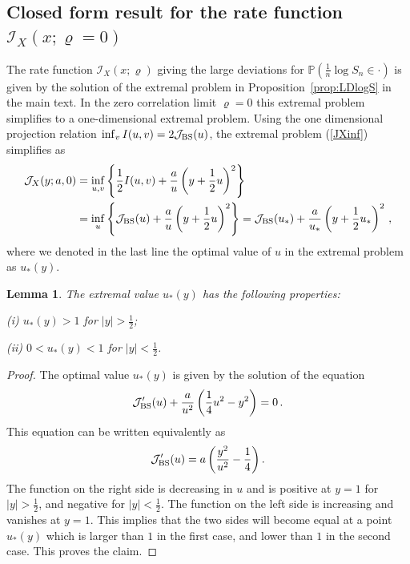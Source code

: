 \documentclass[11pt]{article}
\numberwithin{equation}{section}
\theoremstyle{plain}
\newtheorem{lemma}[theorem]{Lemma}
\begin{document}
\subsection{Closed form result for the rate function $\mathcal{I}_X(x;\varrho=0)$}
\label{sec:a1}

The rate function  $\mathcal{I}_X(x;\varrho)$ giving the large deviations for 
$\mathbb{P}(\frac{1}{n}
\log S_n\in \cdot)$ is given by the solution of the extremal problem
in Proposition~\ref{prop:LDlogS} in the main text. %
In the zero correlation limit $\varrho=0$ this extremal problem simplifies 
to a one-dimensional extremal problem. Using the one dimensional projection 
relation $\inf_v I(u,v) = 2\mathcal{J}_{\rm BS}(u)$, the extremal problem 
(\ref{JXinf}) simplifies as
\begin{align}\label{1dimJX}
\mathcal{J}_X(y; a,0) &=\inf_{u,v} \left\{ \frac12 I(u,v) + \frac{a}{u}
\left( y + \frac12 u \right)^2 \right\} \\
&= \inf_{u} \left\{ \mathcal{J}_{\rm BS}(u) + \frac{a}{u}
\left( y + \frac12 u \right)^2 \right\}
= \mathcal{J}_{\rm BS}(u_*) + \frac{a}{u_*}
\left( y + \frac12 u_* \right)^2\,, \nonumber
\end{align}
where we denoted in the last line the 
optimal value of $u$ in the extremal problem as $u_*(y)$. 

\begin{lemma}\label{lemma:1}
The extremal value $u_*(y)$ has the following properties:

(i) $u_*(y) > 1$ for $|y| > \frac12$;

(ii) $0 < u_*(y) < 1$ for $|y| < \frac12$.
\end{lemma}

\begin{proof}
The optimal value $u_*(y)$ is given by the solution of the equation
\begin{equation}\label{eq:ust}
\mathcal{J}_{\rm BS}'(u) + \frac{a}{u^2} \left( \frac14 u^2 - y^2\right) = 0\,.
\end{equation}
This equation can be written equivalently as
\begin{equation}
\mathcal{J}_{\rm BS}'(u) = a \left( \frac{y^2}{u^2} - \frac14 \right).
\end{equation}
The function on the right side is decreasing in $u$ and is positive at $y=1$ for $|y| > \frac12$,
and negative for $|y| < \frac12$. The function on the left side is increasing and vanishes at $y=1$.
This implies that the two sides will become equal at a point $u_*(y)$ which is larger than $1$ in the 
first case, and lower than $1$ in the second case. This proves the claim.
\end{proof}
\end{document}

